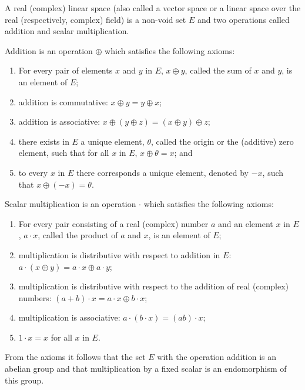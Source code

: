 A real (complex) linear space (also called a vector space or a linear space over the real (respectively, complex) field) is a non-void set $E$ and two operations called addition and scalar multiplication.

Addition is an operation $\oplus$ which satisfies the following axioms:

\begin{enumerate}
\item[(i)] For every pair of elements $x$ and $y$ in $E$, $x \oplus y$, called the sum of $x$ and $y$, is an element of $E$;
\item[(ii)] addition is commutative: $x \oplus y = y \oplus x$;
\item[(iii)] addition is associative: $x \oplus (y \oplus z) = (x \oplus y) \oplus z$;
\item[(iv)] there exists in $E$ a unique element, $\theta$, called the origin or the (additive) zero element, such that for all $x$ in $E$, $x \oplus \theta = x$; and
\item[(v)] to every $x$ in $E$ there corresponds a unique element, denoted by $-x$, such that $x \oplus (-x) = \theta$.
\end{enumerate}

Scalar multiplication is an operation $\cdot$ which satisfies the following axioms:

\begin{enumerate}
\item[(vi)] For every pair consisting of a real (complex) number $a$ and an element $x$ in $E$, $a \cdot x$, called the product of $a$ and $x$, is an element of $E$;
\item[(vii)] multiplication is distributive with respect to addition in $E$: $a \cdot (x \oplus y) = a \cdot x \oplus a \cdot y$;
\item[(viii)] multiplication is distributive with respect to the addition of real (complex) numbers: $(a + b) \cdot x = a \cdot x \oplus b \cdot x$;
\item[(ix)] multiplication is associative: $a \cdot (b \cdot x) = (ab) \cdot x$;
\item[(x)] $1 \cdot x = x$ for all $x$ in $E$.
\end{enumerate}

From the axioms it follows that the set $E$ with the operation addition is an abelian group and that multiplication by a fixed scalar is an endomorphism of this group.
